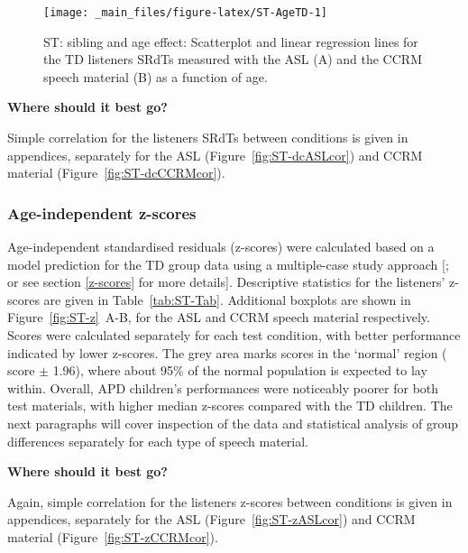 \documentclass[a4paper, twoside]{templates/ociamthesis}
\begin{document}
\begin{figure}[h]

{\centering \texttt{[image: \_main\_files/figure-latex/ST-AgeTD-1]} 

}

\caption{ST: sibling and age effect: Scatterplot and linear regression lines for the TD listeners SRdTs measured with the ASL (A) and the CCRM speech material (B) as a function of age.}\label{fig:ST-AgeTD}
\end{figure}

\begin{correction}
\textbf{Where should it best go?}

Simple correlation for the listeners SRdTs between conditions is given
in appendices, separately for the ASL (Figure~\ref{fig:ST-dcASLcor}) and
CCRM material (Figure~\ref{fig:ST-dcCCRMcor}).
\end{correction}

\hypertarget{age-independent-z-scores}{%
\subsubsection*{Age-independent z-scores}\label{age-independent-z-scores}}

Age-independent standardised residuals (z-scores) were calculated based on a model prediction for the TD group data using a multiple-case study approach {[}\textcite{Ramus2003}; or see section \ref{z-scores} for more details{]}. Descriptive statistics for the listeners' z-scores are given in Table~\ref{tab:ST-Tab}. Additional boxplots are shown in Figure~\ref{fig:ST-z}~A-B, for the ASL and CCRM speech material respectively. Scores were calculated separately for each test condition, with better performance indicated by lower z-scores. The grey area marks scores in the `normal' region (\textbar{} score \textbar{} \(\pm\) 1.96), where about 95\% of the normal population is expected to lay within. Overall, APD children's performances were noticeably poorer for both test materials, with higher median z-scores compared with the TD children. The next paragraphs will cover inspection of the data and statistical analysis of group differences separately for each type of speech material.\\

\begin{correction}
\textbf{Where should it best go?}

Again, simple correlation for the listeners z-scores between conditions
is given in appendices, separately for the ASL
(Figure~\ref{fig:ST-zASLcor}) and CCRM material
(Figure~\ref{fig:ST-zCCRMcor}).
\end{correction}
\end{document}
